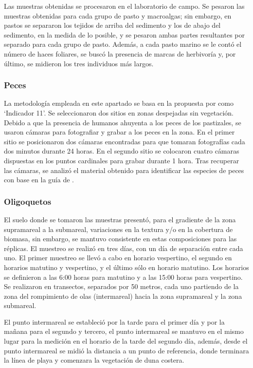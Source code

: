 \documentclass[
  authoryear,
  preprint,
  3p,
  twocolumn]{elsarticle}
\begin{document}
Las muestras obtenidas se procesaron en el laboratorio de campo. Se
pesaron las muestras obtenidas para cada grupo de pasto y macroalgas;
sin embargo, en pastos se separaron los tejidos de arriba del sedimento
y los de abajo del sedimento, en la medida de lo posible, y se pesaron
ambas partes resultantes por separado para cada grupo de pasto. Además,
a cada pasto marino se le contó el número de haces foliares, se buscó la
presencia de marcas de herbivoría y, por último, se midieron los tres
individuos más largos.

\subsubsection{Peces}\label{peces}

La metodología empleada en este apartado se basa en la propuesta por
\citet{Botello2022} como `Indicador 11'. Se seleccionaron dos sitios en
zonas despejadas sin vegetación. Debido a que la presencia de humanos
ahuyenta a los peces de los pastizales, se usaron cámaras para
fotografiar y grabar a los peces en la zona. En el primer sitio se
posicionaron dos cámaras encontradas para que tomaran fotografías cada
dos minutos durante 24 horas. En el segundo sitio se colocaron cuatro
cámaras dispuestas en los puntos cardinales para grabar durante 1 hora.
Tras recuperar las cámaras, se analizó el material obtenido para
identificar las especies de peces con base en la guía de
\citet{Gallardo-Torres2014}.

\subsubsection{Oligoquetos}\label{oligoquetos}

El suelo donde se tomaron las muestras presentó, para el gradiente de la
zona supramareal a la submareal, variaciones en la textura y/o en la
cobertura de biomasa, sin embargo, se mantuvo consistente en estas
composiciones para las réplicas. El muestreo se realizó en tres días,
con un día de separación entre cada uno. El primer muestreo se llevó a
cabo en horario vespertino, el segundo en horarios matutino y
vespertino, y el último sólo en horario matutino. Los horarios se
definieron a las 6:00 horas para matutino y a las 15:00 horas para
vespertino. Se realizaron en transectos, separados por 50 metros, cada
uno partiendo de la zona del rompimiento de olas (intermareal) hacia la
zona supramareal y la zona submareal.

El punto intermareal se estableció por la tarde para el primer día y por
la mañana para el segundo y tercero, el punto intermareal se mantuvo en
el mismo lugar para la medición en el horario de la tarde del segundo
día, además, desde el punto intermareal se midió la distancia a un punto
de referencia, donde terminara la línea de playa y comenzara la
vegetación de duna costera.
\end{document}

